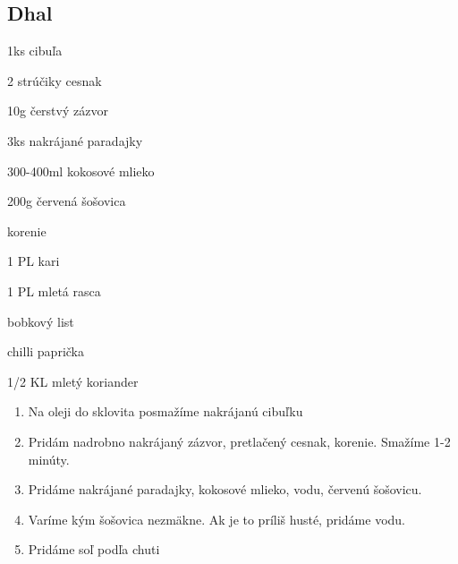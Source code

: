 \setcounter{step}{0}
\subsection{Dhal}

\begin{ingredient}

\def\portions{4}%


\begin{main}
	\item 1ks cibuľa
	\item 2 strúčiky cesnak
	\item 10g čerstvý zázvor 
	\item 3ks nakrájané paradajky
	\item 300-400ml kokosové mlieko
	\item 200g červená šošovica
\end{main}
\begin{subingredient}{korenie}
	\item 1 PL kari
	\item 1 PL mletá rasca
	\item bobkový list
	\item chilli paprička
	\item 1/2 KL mletý koriander
\end{subingredient}

\end{ingredient}
\begin{recipe}

\begin{enumerate}
\item{Na oleji do sklovita posmažíme nakrájanú cibuľku}
\item{Pridám nadrobno nakrájaný zázvor, pretlačený cesnak, korenie. Smažíme 1-2 minúty.}
\item{Pridáme nakrájané paradajky, kokosové mlieko, vodu, červenú šošovicu.}
\item{Varíme kým šošovica nezmäkne. Ak je to príliš husté, pridáme vodu.}
\item{Pridáme soľ podľa chuti}
\end{enumerate}

\end{recipe}

\begin{notes}

\end{notes}	
\clearpage